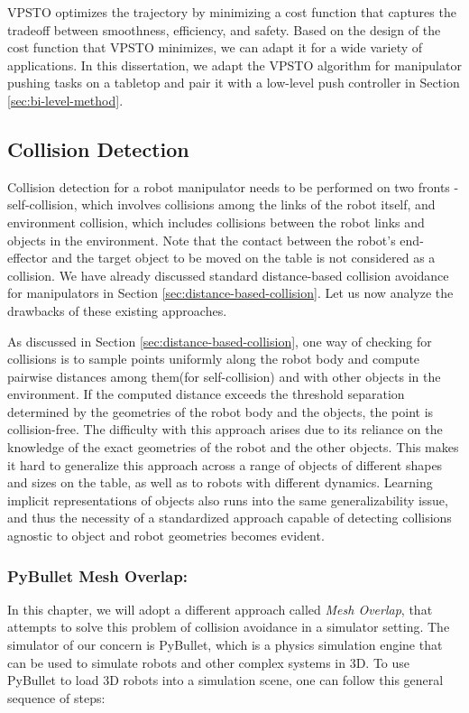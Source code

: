 VPSTO optimizes the trajectory by minimizing a cost function that captures the tradeoff between smoothness, efficiency, and safety. Based on the design of the cost function that VPSTO minimizes, we can adapt it for a wide variety of applications. In this dissertation, we adapt the VPSTO algorithm for manipulator pushing tasks on a tabletop and pair it with a low-level push controller in Section \ref{sec:bi-level-method}.

\subsection{Collision Detection}

Collision detection for a robot manipulator needs to be performed on two fronts - self-collision, which involves collisions among the links of the robot itself, and environment collision, which includes collisions between the robot links and objects in the environment. Note that the contact between the robot's end-effector and the target object to be moved on the table is not considered as a collision. We have already discussed standard distance-based collision avoidance for manipulators in Section \ref{sec:distance-based-collision}. Let us now analyze the drawbacks of these existing approaches. 

As discussed in Section \ref{sec:distance-based-collision}, one way of checking for collisions is to sample points uniformly along the robot body and compute pairwise distances among them(for self-collision) and with other objects in the environment. If the computed distance exceeds the threshold separation determined by the geometries of the robot body and the objects, the point is collision-free. The difficulty with this approach arises due to its reliance on the knowledge of the exact geometries of the robot and the other objects. This makes it hard to generalize this approach across a range of objects of different shapes and sizes on the table, as well as to robots with different dynamics. Learning implicit representations of objects also runs into the same generalizability issue, and thus the necessity of a standardized approach capable of detecting collisions agnostic to object and robot geometries becomes evident. 

\subsubsection{PyBullet Mesh Overlap:}
In this chapter, we will adopt a different approach called 
\textit{Mesh Overlap}, that attempts to solve this problem of collision avoidance in a simulator setting. The simulator of our concern is PyBullet, which is a physics simulation engine that can be used to simulate robots and other complex systems in 3D. To use PyBullet to load 3D robots into a simulation scene, one can follow this  general sequence of steps:

